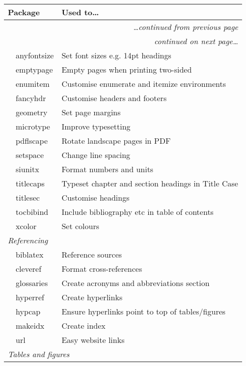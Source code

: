 
\begin{longtable}{l >{\ttfamily}l l}
    \toprule
    \multicolumn{2}{l}{\textnormal{Package}} & Used to\dots\\
    \midrule
    \endfirsthead
    \multicolumn{3}{r}{\small\textit{\dots continued from previous page}}\\
    \midrule
    \endhead
    \midrule
    \multicolumn{3}{r}{\small\textit{continued on next page\dots}}
    \endfoot
    \endlastfoot
    \multicolumn{3}{l}{\textit{Typesetting}}\\
    & anyfontsize & Set font sizes e.g. 14pt headings\\
    & emptypage & Empty pages when printing two-sided\\
    & enumitem & Customise enumerate and itemize environments\\
    & fancyhdr & Customise headers and footers\\
    & geometry & Set page margins\\
    & microtype & Improve typesetting\\
    & pdflscape & Rotate landscape pages in PDF\\
    & setspace & Change line spacing\\
    & siunitx & Format numbers and units\\
    & titlecaps & Typeset chapter and section headings in Title Case\\
    & titlesec & Customise headings\\
    & tocbibind & Include bibliography etc in table of contents\\
    & xcolor & Set colours\\
    \multicolumn{3}{l}{\textit{Referencing}}\\
    & biblatex & Reference sources\\
    & cleveref & Format cross-references\\
    & glossaries & Create acronyms and abbreviations section\\
    & hyperref & Create hyperlinks\\
    & hypcap & Ensure hyperlinks point to top of tables/figures\\
    & makeidx & Create index\\
    & url & Easy website links\\
    \multicolumn{3}{l}{\textit{Tables and figures}}\\

\end{longtable}
